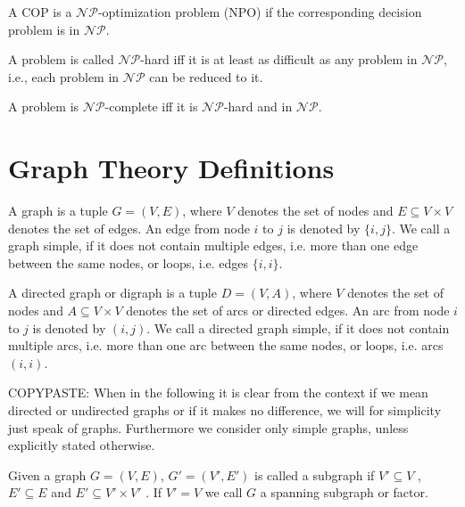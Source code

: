\begin{definition}
A COP is a $\mathcal{NP}$-optimization problem (NPO) if the corresponding decision problem is in $\mathcal{NP}$.
\end{definition}

\begin{definition}
A problem is called $\mathcal{NP}$-hard iff it is at least as difficult as any problem in $\mathcal{NP}$, i.e., each problem in $\mathcal{NP}$ can be reduced to it.
\end{definition}

\begin{definition}
A problem is $\mathcal{NP}$-complete iff it is $\mathcal{NP}$-hard and in $\mathcal{NP}$.
\end{definition}

\section{Graph Theory Definitions}

\begin{definition}[Graph]
A graph is a tuple $G = (V, E)$, where $V$ denotes the set of nodes and $E \subseteq V \times V$ denotes the set of edges. An edge from node $i$ to $j$ is denoted by $\{i, j\}$. We call a graph simple, if it does not contain multiple edges, i.e. more than one edge between the same nodes, or loops, i.e. edges $\{i, i\}$.
\end{definition}

\begin{definition}
A directed graph or digraph is a tuple $D = (V, A)$, where $V$ denotes the set of nodes and $A \subseteq V \times V$ denotes the set of arcs
or directed edges. An arc from node $i$ to $j$ is denoted by $(i, j)$. We call a directed graph simple, if it does not contain multiple arcs, i.e. more than one arc between the same nodes, or loops, i.e. arcs $(i, i)$.
\end{definition}

COPYPASTE:
When in the following it is clear from the context if we mean directed or undirected graphs or if it makes no difference, we will for simplicity just speak of graphs. Furthermore we consider only simple graphs, unless explicitly stated otherwise.

\begin{definition}
Given a graph $G = (V, E)$, $G' = (V', E')$ is called a subgraph if $V' \subseteq V$ , $E' \subseteq E$ and $E' \subseteq V' \times V'$ . If  $V' = V$ we call $G$ a spanning subgraph or factor.
\end{definition}

